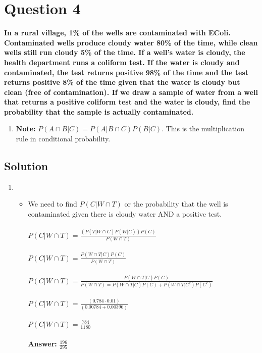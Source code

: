 \documentclass[11pt]{article}
\begin{document}
\clearpage
\section*{Question 4}

    \textbf{In a rural village, 1\% of the wells are contaminated with EColi. Contaminated wells produce cloudy water 80\% of the time, while clean wells still run cloudy 5\% of the time. If a well's water is cloudy, the health department runs a coliform test. If the water is cloudy and contaminated, the test returns positive 98\% of the time and the test returns positive 8\% of the time given that the water is cloudy but clean (free of contamination). If we draw a sample of water from a well that returns a positive coliform test and the water is cloudy, find the probability that the sample is actually contaminated.}
    \begin{enumerate}[label=(\alph*)]
        \item[] \textbf{Note:} $P(A \cap B | C) = P(A | B \cap C)P(B | C)$. This is the multiplication rule in conditional probability.
    \end{enumerate}

    \subsection*{Solution}
    \begin{enumerate}[label=(\alph*)]
        \item []
        \begin{itemize}
            \item[] We need to find \(P(C| W \cap T)\) or the probability that the well is contaminated given there is cloudy water AND a positive test. \\ \\
            \(P(C| W \cap T) = \frac{(P(T| W \cap C)P(W|C))P(C)}{P(W \cap T)}\) \\ \\
            \(P(C| W \cap T) = \frac{P(W \cap T | C)P(C)}{P(W \cap T)}\) \\ \\
            \(P(C| W \cap T) = \frac{P(W \cap T | C)P(C)}{P(W \cap T) = P(W \cap T | C) P(C) + P(W \cap T | C^c) P(C^c)}\) \\ \\
            \(P(C| W \cap T) = \frac{(0.784 \cdot 0.01)}{(0.00784 + 0.00396)}\) \\ \\
            \(P(C| W \cap T) = \frac{784}{1180}\) \\ \\
            \textbf{Answer:} \(\frac{196}{295}\)
        \end{itemize}
    \end{enumerate}
\end{document}
